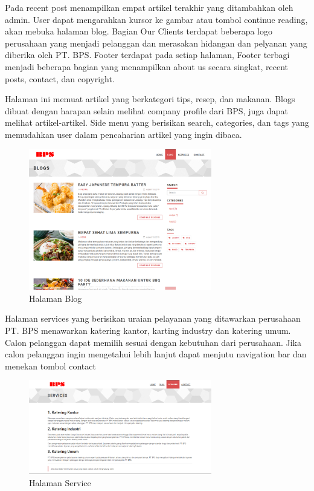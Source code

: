 Pada recent post menampilkan empat artikel terakhir yang ditambahkan oleh admin. 
User dapat mengarahkan kursor ke gambar atau tombol continue reading,  
akan mebuka halaman blog. Bagian Our Clients terdapat beberapa logo perusahaan yang menjadi 
pelanggan dan merasakan hidangan dan pelyanan yang  diberika oleh 
PT. BPS. Footer terdapat pada setiap halaman, 
Footer terbagi menjadi beberapa bagian yang menampilkan about us secara singkat, 
recent posts, contact, dan copyright.

%
%

Halaman ini memuat artikel yang berkategori tips, resep, dan makanan. 
Blogs dibuat dengan harapan selain melihat company profile dari BPS, 
juga dapat melihat artikel-artikel. Side menu yang berisikan search, 
categories, dan tags yang memudahkan user dalam pencaharian artikel yang ingin dibaca.

\begin{figure}[htbp]
    \begin{center}
    \includegraphics[width=8cm]{img/scr-website-blog.png}
    \caption{Halaman Blog}
    \label{gambar:scr-website-blog}
    \end{center}
\end{figure}


Halaman services yang berisikan uraian pelayanan yang ditawarkan perusahaan 
PT. BPS menawarkan katering kantor, karting industry dan katering umum. Calon 
pelanggan dapat memilih sesuai dengan kebutuhan dari perusahaan. 
Jika calon pelanggan ingin mengetahui lebih lanjut dapat menjutu navigation bar dan menekan tombol contact

\begin{figure}[htbp]
    \begin{center}
    \includegraphics[width=8cm]{img/scr-website-service.png}
    \caption{Halaman Service}
    \label{gambar:scr-website-service}
    \end{center}
\end{figure}

